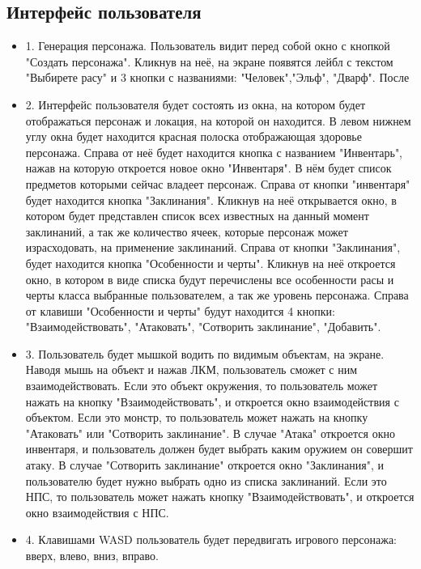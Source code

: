 \subsection{Интерфейс пользователя}
\begin{itemize}
	\item 1. Генерация персонажа. Пользователь видит перед собой окно с кнопкой "Создать персонажа". Кликнув на неё, на экране появятся лейбл с текстом "Выбирете расу" и 3 кнопки с названиями: "Человек","Эльф", "Дварф". После
	\item 2. Интерфейс пользователя будет состоять из окна, на котором будет отображаться персонаж и локация, на которой он находится. В левом нижнем углу окна будет находится красная полоска отображающая здоровье персонажа. Справа от неё будет находится кнопка с названием "Инвентарь", нажав на которую откроется новое окно "Инвентаря". В нём будет список предметов которыми сейчас владеет персонаж. Справа от кнопки "инвентаря" будет находится кнопка "Заклинания". Кликнув на неё открывается окно, в котором будет представлен список всех известных на данный момент заклинаний, а так же количество ячеек, которые персонаж может израсходовать, на применение заклинаний. Справа от кнопки "Заклинания", будет находится кнопка "Особенности и черты". Кликнув на неё откроется окно, в котором в виде списка будут перечислены все особенности расы и черты класса выбранные пользователем, а так же уровень персонажа. Справа от клавиши "Особенности и черты" будут находится 4 кнопки: "Взаимодействовать", "Атаковать", "Сотворить заклинание", "Добавить".
	\item 3. Пользователь будет мышкой водить по видимым объектам, на экране. Наводя мышь на объект и нажав ЛКМ, пользователь сможет с ним взаимодействовать. Если это объект окружения, то пользователь может нажать на кнопку "Взаимодействовать", и откроется окно взаимодействия с объектом. Если это монстр, то  пользователь может нажать на кнопку "Атаковать" или "Сотворить заклинание". В случае "Атака" откроется окно инвентаря, и пользователь должен будет выбрать каким оружием он совершит атаку. В случае "Сотворить заклинание" откроется окно "Заклинания", и пользователю будет нужно выбрать одно из списка заклинаний. Если это НПС, то пользователь может нажать кнопку "Взаимодействовать", и откроется окно взаимодействия с НПС.
	\item 4. Клавишами WASD пользователь будет передвигать игрового персонажа: вверх, влево, вниз, вправо.
\end{itemize}
